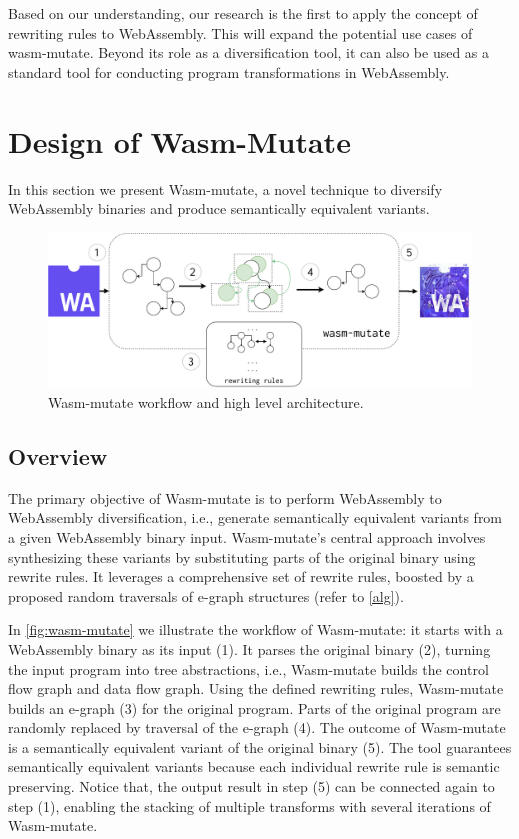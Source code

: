 \documentclass[sigplan,screen]{acmart}
\newcommand{\tool}{Wasm-mutate\xspace}
\begin{document}
Based on our understanding, our research is the first to apply the concept of rewriting rules to WebAssembly.
This will expand the potential use cases of wasm-mutate. 
Beyond its role as a diversification tool, it can also be used as a standard tool for conducting program transformations in WebAssembly.


\section {Design of Wasm-Mutate}


In this section we present \tool, a novel technique to diversify
WebAssembly binaries and produce semantically equivalent variants.

\begin{figure}[h!]
    \centering
    \includegraphics[width=0.8\linewidth]{figures/wasm-mutate-general.pdf}
    \caption{ \tool workflow and high level architecture.}
  \label{fig:wasm-mutate}
\end{figure}

\subsection{Overview}
The primary objective of \tool is to perform WebAssembly to WebAssembly diversification, i.e., generate semantically equivalent variants from a given WebAssembly binary input. 
\tool's central approach involves synthesizing these variants by substituting parts of the original binary using rewrite rules. 
It leverages a comprehensive set of rewrite rules, boosted by a proposed random traversals of e-graph structures (refer to \autoref{alg}).


In \autoref{fig:wasm-mutate} we illustrate the workflow of \tool: it starts with a WebAssembly binary as its input (1).
It parses the original binary (2), turning the input program into tree abstractions, i.e., \tool builds the control flow graph and data flow graph. 
Using the defined rewriting rules, \tool builds an e-graph (3) for the original program.
Parts of the original program are randomly replaced by traversal of the e-graph (4).
The outcome of \tool is a semantically equivalent variant of the original binary (5).
The tool guarantees semantically equivalent variants because each individual rewrite rule is semantic preserving.
Notice that, the output result in step (5) can be connected again to step (1), enabling the stacking of multiple transforms with several iterations of \tool. 
\end{document}
